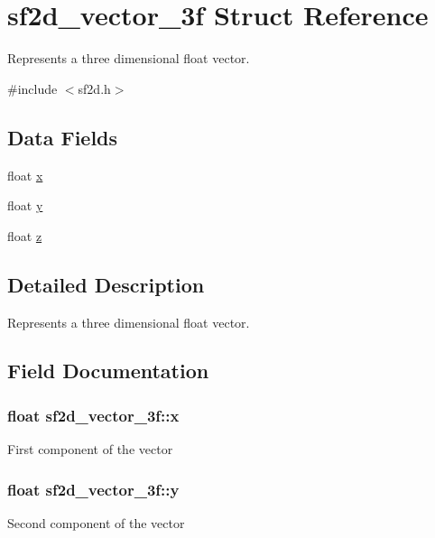 \hypertarget{structsf2d__vector__3f}{}\section{sf2d\+\_\+vector\+\_\+3f Struct Reference}
\label{structsf2d__vector__3f}


Represents a three dimensional float vector.  




{\ttfamily \#include $<$sf2d.\+h$>$}

\subsection*{Data Fields}
\begin{DoxyCompactItemize}
\item 
float \hyperlink{structsf2d__vector__3f_acfe35bcf39de79f3edd634ad1bce3d74}{x}
\item 
float \hyperlink{structsf2d__vector__3f_ac7f2e5651290011f9c1fbe017dec219e}{y}
\item 
float \hyperlink{structsf2d__vector__3f_ab8ae4e1b464f00ac0d6dc3714f94ac18}{z}
\end{DoxyCompactItemize}


\subsection{Detailed Description}
Represents a three dimensional float vector. 

\subsection{Field Documentation}
\hypertarget{structsf2d__vector__3f_acfe35bcf39de79f3edd634ad1bce3d74}{}
\subsubsection[{x}]{\setlength{\rightskip}{0pt plus 5cm}float sf2d\+\_\+vector\+\_\+3f\+::x}\label{structsf2d__vector__3f_acfe35bcf39de79f3edd634ad1bce3d74}
First component of the vector \hypertarget{structsf2d__vector__3f_ac7f2e5651290011f9c1fbe017dec219e}{}
\subsubsection[{y}]{\setlength{\rightskip}{0pt plus 5cm}float sf2d\+\_\+vector\+\_\+3f\+::y}\label{structsf2d__vector__3f_ac7f2e5651290011f9c1fbe017dec219e}
Second component of the vector \hypertarget{structsf2d__vector__3f_ab8ae4e1b464f00ac0d6dc3714f94ac18}{}
